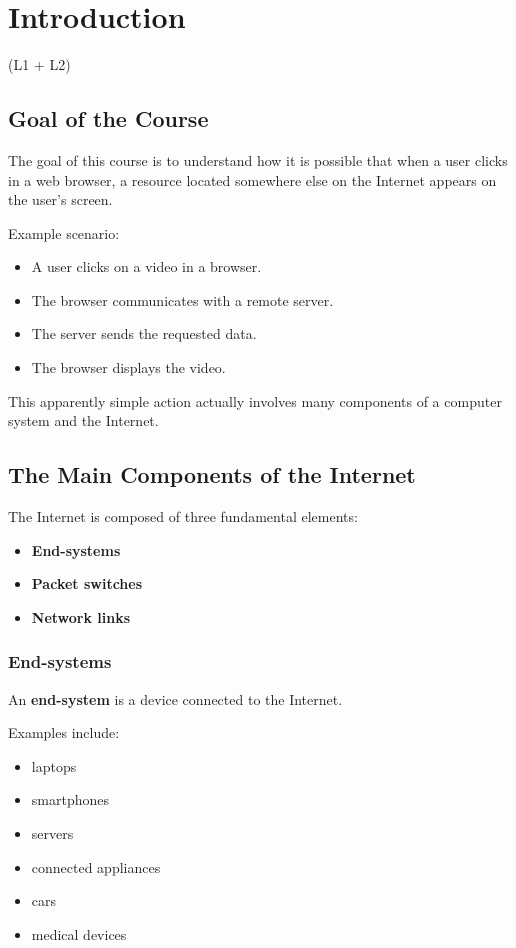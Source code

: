 
\section{Introduction}
(L1 + L2)

\subsection{Goal of the Course}

The goal of this course is to understand how it is possible that when a user clicks in a web browser, a resource located somewhere else on the Internet appears on the user's screen.

Example scenario:
\begin{itemize}
\item A user clicks on a video in a browser.
\item The browser communicates with a remote server.
\item The server sends the requested data.
\item The browser displays the video.
\end{itemize}

This apparently simple action actually involves many components of a computer system and the Internet.

\subsection{The Main Components of the Internet}

The Internet is composed of three fundamental elements:

\begin{itemize}
\item \textbf{End-systems}
\item \textbf{Packet switches}
\item \textbf{Network links}
\end{itemize}

\subsubsection{End-systems}

An \textbf{end-system} is a device connected to the Internet.

Examples include:

\begin{itemize}
\item laptops
\item smartphones
\item servers
\item connected appliances
\item cars
\item medical devices
\end{itemize}

